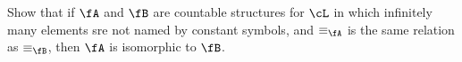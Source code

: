 \begin{problem}
  Show that if $\fA$ and $\fB$ are countable structures for $\cL$
  in which infinitely many elements sre not named by constant symbols,
  and $\equiv_\fA$ is the same relation as $\equiv_\fB$,
  then $\fA$ is isomorphic to $\fB$.
\end{problem}
\begin{Answer}

\end{Answer}
